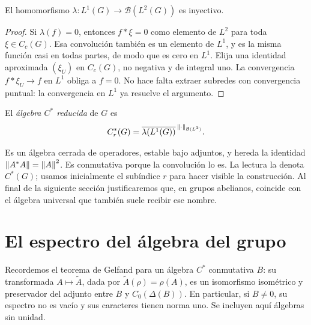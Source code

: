 \begin{proposicion}\label{v4:regular-fiel}
El homomorfismo $\lambda:L^1(G)\to\mathcal B(L^2(G))$ es inyectivo.
\end{proposicion}
\begin{proof}
Si $\lambda(f)=0$, entonces $f*\xi=0$ como elemento de $L^2$ para toda $\xi\in C_c(G)$. Esa convolución también es un elemento de $L^1$, y es la misma función casi en todas partes, de modo que es cero en $L^1$. Elija una identidad aproximada $(\xi_U)$ en $C_c(G)$, no negativa y de integral uno. La convergencia $f*\xi_U\to f$ en $L^1$ obliga a $f=0$. No hace falta extraer subredes con convergencia puntual: la convergencia en $L^1$ ya resuelve el argumento.
\end{proof}

\begin{definicion}
El \emph{álgebra $C^*$ reducida} de $G$ es
\[
 C_r^*(G)=\overline{\lambda(L^1(G))}^{\,\left\lVert\cdot\right\rVert_{\mathcal B(L^2)}}.
\]
\end{definicion}
Es un álgebra cerrada de operadores, estable bajo adjuntos, y hereda la identidad $\left\lVert A^*A\right\rVert=\left\lVert A\right\rVert^2$. Es conmutativa porque la convolución lo es. La lectura la denota $C^*(G)$; usamos inicialmente el subíndice $r$ para hacer visible la construcción. Al final de la siguiente sección justificaremos que, en grupos abelianos, coincide con el álgebra universal que también suele recibir ese nombre.

\section{El espectro del álgebra del grupo}
Recordemos el teorema de Gelfand para un álgebra $C^*$ conmutativa $B$: su transformada $A\mapsto\widetilde A$, dada por $\widetilde A(\rho)=\rho(A)$, es un isomorfismo isométrico y preservador del adjunto entre $B$ y $C_0(\Delta(B))$. En particular, si $B\ne0$, su espectro no es vacío y sus caracteres tienen norma uno. Se incluyen aquí álgebras sin unidad.


